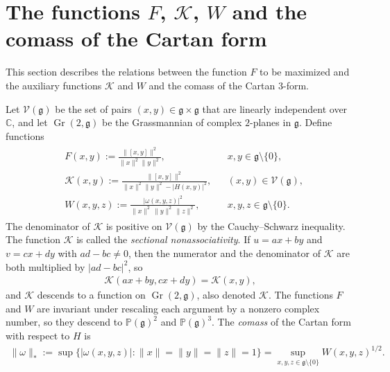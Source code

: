 \documentclass[leqno,10pt]{amsart}
\theoremstyle{definition}
\numberwithin{equation}{section}
\newcommand{\grass}{\operatorname{Gr}}
\newcommand{\sect}{\mathscr{K}}
\newcommand{\om}{\omega}
\newcommand{\proj}{\mathbb{P}}
\newcommand{\g}{\mathfrak{g}}
\newcommand{\stiefel}{\mathscr{V}}
\newcommand{\com}{\mathbb C}
\newcommand{\norm}[1]{\lVert #1\rVert}
\newcommand{\comass}[1]{\lVert #1\rVert_{\ast}}%
\begin{document}
\section{The functions $F$, $\sect$, $W$ and the comass of the Cartan form}\label{sec:reform}

This section describes the relations between the function $F$ to be maximized and the auxiliary functions $\sect$ and $W$ and the comass of the Cartan $3$-form.

Let $\stiefel(\g)$ be the set of pairs $(x, y) \in \g \times \g$ that are linearly independent over $\com$, and let $\grass(2, \g)$ be the Grassmannian of complex $2$-planes in $\g$. Define functions
\begin{align}\label{eq:FKWdef}
\begin{aligned}
&F(x,y) := \frac{\norm{[x, y]}^2}{\norm{x}^{2}\norm{y}^{2}}, && x, y \in \g\setminus\{0\},\\
&\sect(x,y) := \frac{\norm{[x, y]}^2}{\norm{x}^{2}\norm{y}^{2} - |H(x, y)|^{2}}, && (x, y) \in \stiefel(\g),\\
& W(x,y,z):=\frac{|\omega(x,y,z)|^2}{\norm{x}^{2}\,\norm{y}^{2}\,\norm{z}^{2}}, && x, y, z \in \g\setminus\{0\}.
\end{aligned}
\end{align}
The denominator of $\sect$ is positive on $\stiefel(\g)$ by the Cauchy--Schwarz inequality. The function $\sect$ is called the \emph{sectional nonassociativity}. If $u = ax + by$ and $v = cx + dy$ with $ad - bc \neq 0$, then the numerator and the denominator of $\sect$ are both multiplied by $|ad - bc|^{2}$, so
\begin{align}\label{eq:sectinvariance}
\sect(ax + by, cx + dy) = \sect(x, y),
\end{align}
and $\sect$ descends to a function on $\grass(2, \g)$, also denoted $\sect$. The functions $F$ and $W$ are invariant under rescaling each argument by a nonzero complex number, so they descend to $\proj(\g)^{2}$ and $\proj(\g)^{3}$. The \emph{comass} of the Cartan form with respect to $H$ is
\begin{align}\label{eq:comass}
\comass{\om} := \sup\big\{|\om(x, y, z)|: \norm{x} = \norm{y} = \norm{z} = 1\big\} = \sup_{x, y, z \in \g \setminus \{0\}} W(x, y, z)^{1/2}.
\end{align}
\end{document}
